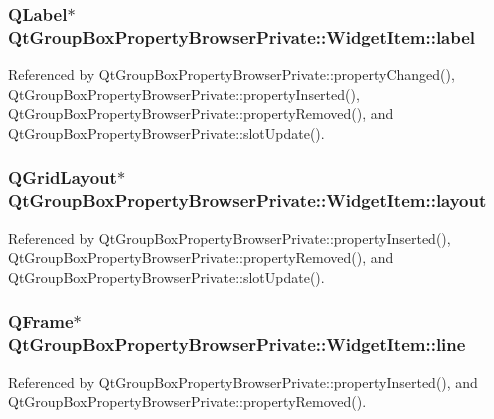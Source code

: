 \subsubsection[{label}]{\setlength{\rightskip}{0pt plus 5cm}Q\+Label$\ast$ Qt\+Group\+Box\+Property\+Browser\+Private\+::\+Widget\+Item\+::label}\label{structQtGroupBoxPropertyBrowserPrivate_1_1WidgetItem_aeb2cb857f06b6a463bfab5a94c11c262}


Referenced by Qt\+Group\+Box\+Property\+Browser\+Private\+::property\+Changed(), Qt\+Group\+Box\+Property\+Browser\+Private\+::property\+Inserted(), Qt\+Group\+Box\+Property\+Browser\+Private\+::property\+Removed(), and Qt\+Group\+Box\+Property\+Browser\+Private\+::slot\+Update().

\subsubsection[{layout}]{\setlength{\rightskip}{0pt plus 5cm}Q\+Grid\+Layout$\ast$ Qt\+Group\+Box\+Property\+Browser\+Private\+::\+Widget\+Item\+::layout}\label{structQtGroupBoxPropertyBrowserPrivate_1_1WidgetItem_a4ef9b8aefa6aa67312aa4d2fbbce24fd}


Referenced by Qt\+Group\+Box\+Property\+Browser\+Private\+::property\+Inserted(), Qt\+Group\+Box\+Property\+Browser\+Private\+::property\+Removed(), and Qt\+Group\+Box\+Property\+Browser\+Private\+::slot\+Update().

\subsubsection[{line}]{\setlength{\rightskip}{0pt plus 5cm}Q\+Frame$\ast$ Qt\+Group\+Box\+Property\+Browser\+Private\+::\+Widget\+Item\+::line}\label{structQtGroupBoxPropertyBrowserPrivate_1_1WidgetItem_a1c2ba5c5758a45a9e9c7e404d4abfa48}


Referenced by Qt\+Group\+Box\+Property\+Browser\+Private\+::property\+Inserted(), and Qt\+Group\+Box\+Property\+Browser\+Private\+::property\+Removed().

